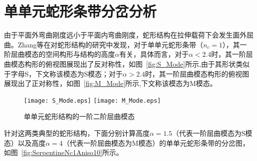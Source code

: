 \section{单单元蛇形条带分岔分析}
由于平面外弯曲刚度远小于平面内弯曲刚度，蛇形结构在拉伸载荷下会发生面外屈曲。Zhang等\cite{zhang2013buckling}在对蛇形结构的研究中发现，对于单单元蛇形条带（$n_c=1$），其一阶屈曲模态的空间构形与结构的高度$\alpha$有关，具体而言，对于$\alpha<2.4$时，其一阶屈曲模态构形的俯视图展现出了反对称性，如图~\ref{fig:S_Mode}所示,由于其形状类似于字母S，下文称该模态为S模态；对于$\alpha>2.4$时，其一阶屈曲模态构形的俯视图展现出了正对称性，如图~\ref{fig:M_Mode}所示,下文称该模态为M模态。
\begin{figure}
	\centering
	{\texttt{[image: S\_Mode.eps]}}
	{\texttt{[image: M\_Mode.eps]}}
	\caption{单单元蛇形结构的一阶二阶屈曲模态}
	\label{fig:SM_Mode}
\end{figure}
针对这两类典型的蛇形结构，下面分别计算高度$\alpha=1.5$（代表一阶屈曲模态为S模态）以及高度$\alpha=4$（代表一阶屈曲模态为M模态）的单单元蛇形条带的分岔图，如图~\ref{fig:SerpentineNc1Aniso10}所示。

